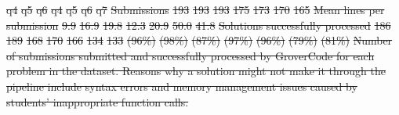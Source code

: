 \documentclass[12pt,twoside]{mitthesis}
\providecommand{\DIFdeltex}[1]{{\protect\color{red}\sout{#1}}}                      %
\providecommand{\DIFdelFL}[1]{\DIFdel{#1}} %
\providecommand{\DIFdel}[1]{\texorpdfstring{\DIFdeltex{#1}}{}} %
\begin{document}
{{{{{{{{{{%
\DIFdelFL{q4 }%
\DIFdelFL{q5 }%
\DIFdelFL{q6 }%
\DIFdelFL{q4 }%
\DIFdelFL{q5 }%
\DIFdelFL{q6 }%
\DIFdelFL{q7 }%
\DIFdelFL{Submissions }%
\DIFdelFL{193 }%
\DIFdelFL{193 }%
\DIFdelFL{193 }%
\DIFdelFL{175 }%
\DIFdelFL{173 }%
\DIFdelFL{170 }%
\DIFdelFL{165 }%
\DIFdelFL{Mean lines per submission }%
\DIFdelFL{9.9 }%
\DIFdelFL{16.9 }%
\DIFdelFL{19.8 }%
\DIFdelFL{12.3 }%
\DIFdelFL{20.9 }%
\DIFdelFL{50.0 }%
\DIFdelFL{41.8 }%
\DIFdelFL{Solutions successfully processed }%
\DIFdelFL{186 }%
\DIFdelFL{189 }%
\DIFdelFL{168  }%
\DIFdelFL{170 }%
\DIFdelFL{166  }%
\DIFdelFL{134 }%
\DIFdelFL{133 }%
\DIFdelFL{(96\%) }%
\DIFdelFL{(98\%) }%
\DIFdelFL{(87\%) }%
\DIFdelFL{(97\%) }%
\DIFdelFL{(96\%) }%
\DIFdelFL{(79\%) }%
\DIFdelFL{(81\%) }%
{%
\DIFdelFL{Number of submissions submitted and successfully processed  by GroverCode for each problem in the dataset. Reasons why a solution might not make it through the pipeline include syntax errors and memory management issues caused by students' inappropriate function calls.}}

}}}}}}}}}}
\end{document}
